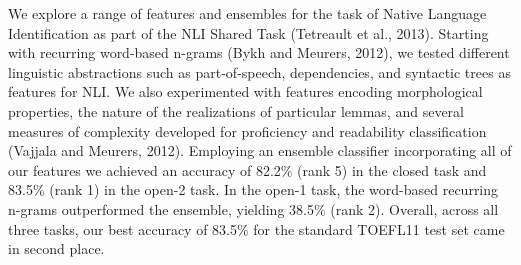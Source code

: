 We explore a range of features and ensembles for the task of Native Language Identification as part of the NLI Shared Task (Tetreault et al., 2013).
 Starting with recurring word-based n-grams (Bykh and Meurers, 2012), we tested
 different linguistic abstractions such as part-of-speech, dependencies, and
 syntactic trees as features for NLI. We also experimented with features
 encoding morphological properties, the nature of the realizations of particular
 lemmas, and several measures of complexity developed for proficiency and
 readability classification (Vajjala and Meurers, 2012). Employing an ensemble
 classifier incorporating all of our features we achieved an accuracy of 82.2\%
 (rank 5) in the closed task and 83.5\% (rank 1) in the open-2 task. In the
 open-1 task, the word-based recurring n-grams outperformed the ensemble,
 yielding 38.5\% (rank 2). Overall, across all three tasks, our best accuracy of
 83.5\% for the standard TOEFL11 test set came in second place.

